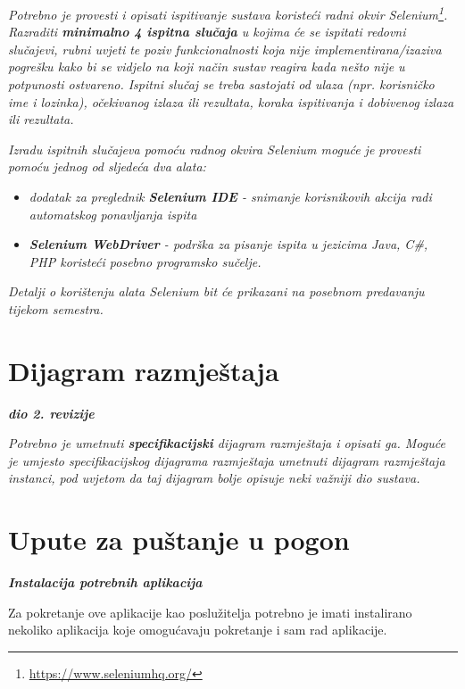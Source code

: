			 \textit{Potrebno je provesti i opisati ispitivanje sustava koristeći radni okvir Selenium\footnote{\url{https://www.seleniumhq.org/}}. Razraditi \textbf{minimalno 4 ispitna slučaja} u kojima će se ispitati redovni slučajevi, rubni uvjeti te poziv funkcionalnosti koja nije implementirana/izaziva pogrešku kako bi se vidjelo na koji način sustav reagira kada nešto nije u potpunosti ostvareno. Ispitni slučaj se treba sastojati od ulaza (npr. korisničko ime i lozinka), očekivanog izlaza ili rezultata, koraka ispitivanja i dobivenog izlaza ili rezultata.\\ }
			 
			 \textit{Izradu ispitnih slučajeva pomoću radnog okvira Selenium moguće je provesti pomoću jednog od sljedeća dva alata:}
			 \begin{itemize}
			 	\item \textit{dodatak za preglednik \textbf{Selenium IDE} - snimanje korisnikovih akcija radi automatskog ponavljanja ispita	}
			 	\item \textit{\textbf{Selenium WebDriver} - podrška za pisanje ispita u jezicima Java, C\#, PHP koristeći posebno programsko sučelje.}
			 \end{itemize}
		 	\textit{Detalji o korištenju alata Selenium bit će prikazani na posebnom predavanju tijekom semestra.}
			
			\eject 
		
		
		\section{Dijagram razmještaja}
			
			\textbf{\textit{dio 2. revizije}}
			
			 \textit{Potrebno je umetnuti \textbf{specifikacijski} dijagram razmještaja i opisati ga. Moguće je umjesto specifikacijskog dijagrama razmještaja umetnuti dijagram razmještaja instanci, pod uvjetom da taj dijagram bolje opisuje neki važniji dio sustava.}
			
			\eject 
		
		\section{Upute za puštanje u pogon}
		
			\textbf{\textit{Instalacija potrebnih aplikacija}}
			
			Za pokretanje ove aplikacije kao poslužitelja potrebno je imati instalirano nekoliko aplikacija koje omogućavaju pokretanje i sam rad aplikacije.
		
